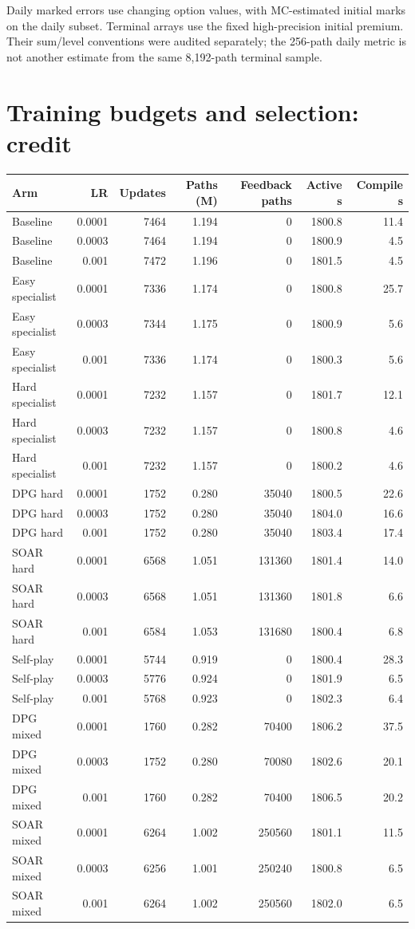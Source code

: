 \documentclass[11pt,a4paper]{article}
\begin{document}
Daily marked errors use changing option values, with MC-estimated initial marks on the daily subset. Terminal arrays use the fixed high-precision initial premium. Their sum/level conventions were audited separately; the 256-path daily metric is not another estimate from the same 8,192-path terminal sample.

\clearpage
\section{Training budgets and selection: credit}
\begin{footnotesize}
\begin{tabular}{lrrrrrr}
\toprule
Arm & LR & Updates & Paths (M) & Feedback paths & Active s & Compile s \\
\midrule
Baseline & 0.0001 & 7464 & 1.194 & 0 & 1800.8 & 11.4 \\
Baseline & 0.0003 & 7464 & 1.194 & 0 & 1800.9 & 4.5 \\
Baseline & 0.001 & 7472 & 1.196 & 0 & 1801.5 & 4.5 \\
Easy specialist & 0.0001 & 7336 & 1.174 & 0 & 1800.8 & 25.7 \\
Easy specialist & 0.0003 & 7344 & 1.175 & 0 & 1800.9 & 5.6 \\
Easy specialist & 0.001 & 7336 & 1.174 & 0 & 1800.3 & 5.6 \\
Hard specialist & 0.0001 & 7232 & 1.157 & 0 & 1801.7 & 12.1 \\
Hard specialist & 0.0003 & 7232 & 1.157 & 0 & 1800.8 & 4.6 \\
Hard specialist & 0.001 & 7232 & 1.157 & 0 & 1800.2 & 4.6 \\
DPG hard & 0.0001 & 1752 & 0.280 & 35040 & 1800.5 & 22.6 \\
DPG hard & 0.0003 & 1752 & 0.280 & 35040 & 1804.0 & 16.6 \\
DPG hard & 0.001 & 1752 & 0.280 & 35040 & 1803.4 & 17.4 \\
SOAR hard & 0.0001 & 6568 & 1.051 & 131360 & 1801.4 & 14.0 \\
SOAR hard & 0.0003 & 6568 & 1.051 & 131360 & 1801.8 & 6.6 \\
SOAR hard & 0.001 & 6584 & 1.053 & 131680 & 1800.4 & 6.8 \\
Self-play & 0.0001 & 5744 & 0.919 & 0 & 1800.4 & 28.3 \\
Self-play & 0.0003 & 5776 & 0.924 & 0 & 1801.9 & 6.5 \\
Self-play & 0.001 & 5768 & 0.923 & 0 & 1802.3 & 6.4 \\
DPG mixed & 0.0001 & 1760 & 0.282 & 70400 & 1806.2 & 37.5 \\
DPG mixed & 0.0003 & 1752 & 0.280 & 70080 & 1802.6 & 20.1 \\
DPG mixed & 0.001 & 1760 & 0.282 & 70400 & 1806.5 & 20.2 \\
SOAR mixed & 0.0001 & 6264 & 1.002 & 250560 & 1801.1 & 11.5 \\
SOAR mixed & 0.0003 & 6256 & 1.001 & 250240 & 1800.8 & 6.5 \\
SOAR mixed & 0.001 & 6264 & 1.002 & 250560 & 1802.0 & 6.5 \\
\bottomrule
\end{tabular}
\end{footnotesize}\par\medskip
\end{document}
